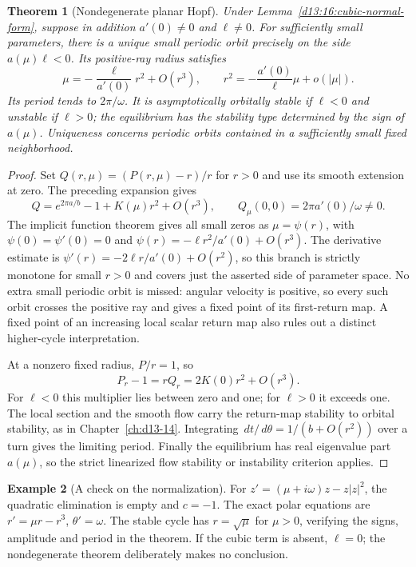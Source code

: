 \documentclass[11pt,oneside]{book}
\newtheorem{theorem}{Theorem}[chapter]
\theoremstyle{definition}
\newtheorem{example}[theorem]{Example}
\theoremstyle{remark}\newtheorem{remark}[theorem]{Remark}
\newcommand{\dd}{\,d}\newcommand{\id}{\operatorname{id}}
\newcommand{\abs}[1]{\lvert#1\rvert}\newcommand{\norm}[1]{\lVert#1\rVert}
\begin{document}
\begin{theorem}[Nondegenerate planar Hopf]\label{d13:16:planar-hopf}
Under Lemma~\ref{d13:16:cubic-normal-form}, suppose in addition
\(a'(0)\neq0\) and \(\ell\neq0\).
For sufficiently small parameters, there is a unique small periodic
orbit precisely on the side \(a(\mu)\ell<0\). Its positive-ray radius
satisfies
\[
 \mu=-\frac{\ell}{a'(0)}r^2+O(r^3),\qquad
 r^2=-\frac{a'(0)}{\ell}\mu+o(\abs{\mu}).
\]
Its period tends to \(2\pi/\omega\).
It is asymptotically orbitally stable if \(\ell<0\) and unstable if
\(\ell>0\); the equilibrium has the stability type determined by
the sign of \(a(\mu)\). Uniqueness concerns periodic orbits contained
in a sufficiently small fixed neighborhood.
\end{theorem}
\begin{proof}
Set \(Q(r,\mu)=(P(r,\mu)-r)/r\) for \(r>0\) and use its smooth extension
at zero. The preceding expansion gives
\[
 Q=e^{2\pi a/b}-1+K(\mu)r^2+O(r^3),\qquad
 Q_\mu(0,0)=2\pi a'(0)/\omega\neq0.
\]
The implicit function theorem gives all small zeros as
\(\mu=\psi(r)\), with \(\psi(0)=\psi'(0)=0\) and
\(\psi(r)=-\ell r^2/a'(0)+O(r^3)\).
The derivative estimate is
\(\psi'(r)=-2\ell r/a'(0)+O(r^2)\), so this branch is strictly monotone
for small \(r>0\) and covers just the asserted side of parameter space.
No extra small periodic orbit is missed: angular velocity is positive,
so every such orbit crosses the positive ray and gives a fixed point of
its first-return map. A fixed point of an increasing local scalar return
map also rules out a distinct higher-cycle interpretation.

At a nonzero fixed radius, \(P/r=1\), so
\[
 P_r-1=rQ_r=2K(0)r^2+O(r^3).
\]
For \(\ell<0\) this multiplier lies between zero and one; for
\(\ell>0\) it exceeds one. The local section and the smooth flow carry
the return-map stability to orbital stability, as in
Chapter~\ref{ch:d13-14}. Integrating
\(\dd t/\dd\theta=1/(b+O(r^2))\) over a turn gives the limiting period.
Finally the equilibrium has real eigenvalue part \(a(\mu)\), so the
strict linearized flow stability or instability criterion applies.
\end{proof}

\begin{example}[A check on the normalization]
For \(z'=(\mu+i\omega)z-z\abs{z}^2\), the quadratic elimination is
empty and \(c=-1\). The exact polar equations are
\(r'=\mu r-r^3\), \(\theta'=\omega\). The stable cycle has
\(r=\sqrt{\mu}\) for \(\mu>0\), verifying the signs, amplitude and
period in the theorem. If the cubic term is absent, \(\ell=0\);
the nondegenerate theorem deliberately makes no conclusion.
\end{example}
\end{document}

